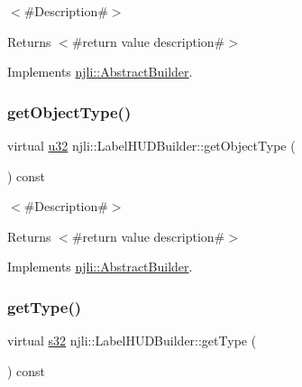 $<$\#\+Description\#$>$

\begin{DoxyReturn}{Returns}
$<$\#return value description\#$>$ 
\end{DoxyReturn}


Implements \mbox{\hyperlink{classnjli_1_1_abstract_builder_a902f73ea78031b06aca183a417f3413b}{njli\+::\+Abstract\+Builder}}.

\mbox{\label{classnjli_1_1_label_h_u_d_builder_a7b2ce22588b0935205f2f116446affd2}} 
\subsubsection{\texorpdfstring{get\+Object\+Type()}{getObjectType()}}
{\footnotesize\ttfamily virtual \mbox{\hyperlink{_util_8h_a10e94b422ef0c20dcdec20d31a1f5049}{u32}} njli\+::\+Label\+H\+U\+D\+Builder\+::get\+Object\+Type (\begin{DoxyParamCaption}{ }\end{DoxyParamCaption}) const\hspace{0.3cm}{\ttfamily [virtual]}}

$<$\#\+Description\#$>$

\begin{DoxyReturn}{Returns}
$<$\#return value description\#$>$ 
\end{DoxyReturn}


Implements \mbox{\hyperlink{classnjli_1_1_abstract_builder_a0f2d344fcf697b167f4f2b1122b5fb33}{njli\+::\+Abstract\+Builder}}.

\mbox{\label{classnjli_1_1_label_h_u_d_builder_aa7e57d529bee575b73ddd4f70d39fd32}} 
\subsubsection{\texorpdfstring{get\+Type()}{getType()}}
{\footnotesize\ttfamily virtual \mbox{\hyperlink{_util_8h_aa62c75d314a0d1f37f79c4b73b2292e2}{s32}} njli\+::\+Label\+H\+U\+D\+Builder\+::get\+Type (\begin{DoxyParamCaption}{ }\end{DoxyParamCaption}) const\hspace{0.3cm}{\ttfamily [virtual]}}

